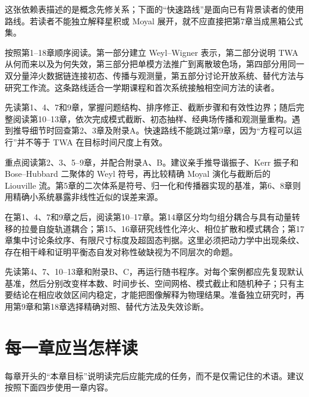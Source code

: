 这张依赖表描述的是概念先修关系；下面的“快速路线”是面向已有背景读者的使用路线。若读者不能独立解释星积或 Moyal 展开，就不应直接把第7章当成黑箱公式集。

\begin{description}[style=nextline,leftmargin=2.2em,font=\bfseries]
  \item[系统学习路线]
  按照第1--18章顺序阅读。第一部分建立 Weyl--Wigner 表示，第二部分说明 TWA 从何而来以及为何失效，第三部分把单模方法推广到离散玻色场，第四部分用同一双分量淬火数据链连接初态、传播与观测量，第五部分讨论开放系统、替代方法与研究工作流。这条路线适合一学期课程和首次系统接触相空间方法的读者。

  \item[快速开始 TWA 计算]
  先读第1、4、7和9章，掌握问题结构、排序修正、截断步骤和有效性边界；随后完整阅读第10--13章，依次完成模式截断、初态抽样、经典场传播和观测量重构。遇到推导细节时回查第2、3章及附录A。快速路线不能跳过第9章，因为“方程可以运行”并不等于 TWA 在目标时间尺度上有效。

  \item[偏重形式理论与推导]
  重点阅读第2、3、5--9章，并配合附录A、B。建议亲手推导谐振子、Kerr 振子和 Bose--Hubbard 二聚体的 Weyl 符号，再比较精确 Moyal 演化与截断后的 Liouville 流。第5章的二次体系是符号、归一化和传播器实现的基准，第6、8章则用精确小系统暴露非线性近似的误差来源。

  \item[双分量凝聚体与淬火动力学]
  在第1、4、7和9章之后，阅读第10--17章。第14章区分均匀组分耦合与具有动量转移的拉曼自旋轨道耦合；第15、16章研究线性化淬火、相位扩散和模式耦合；第17章集中讨论条纹序、有限尺寸标度及超固态判据。这里必须把动力学中出现条纹、存在相干峰和证明平衡态自发对称性破缺视为不同层次的命题。

  \item[数值实现与研究复现]
  先读第4、7、10--13章和附录B、C，再运行随书程序。对每个案例都应先复现默认基准，然后分别改变样本数、时间步长、空间网格、模式截止和随机种子；只有主要结论在相应收敛区间内稳定，才能把图像解释为物理结果。准备独立研究时，再用第9章和第18章选择精确对照、替代方法及失效诊断。
\end{description}

\section*{每一章应当怎样读}

每章开头的“本章目标”说明读完后应能完成的任务，而不是仅需记住的术语。建议按照下面四步使用一章内容。

